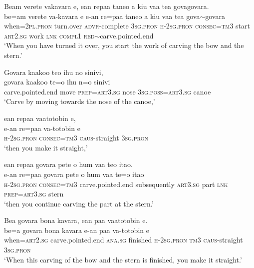 \ea\label{ex:text18-23}
Beam verete vakavara e, ean repaa taneo a kiu vaa tea govagovara.\\
\gll be=am	verete	va-kavara	e	e-an	re=paa	taneo	a	kiu	vaa	tea	gova{$\sim$}govara\\
     when=2\textsc{pl}.\textsc{pron}	turn.over	\textsc{advr}-complete	3\textsc{sg}.\textsc{pron}	\textsc{h}-2\textsc{sg}.\textsc{pron}	\textsc{consec}=\textsc{tm}3	start	\textsc{art}2.\textsc{sg}	work	\textsc{lnk}	\textsc{compl}1	\textsc{red}{$\sim$}carve.pointed.end\\
\glt `When you have turned it over, you start the work of carving the bow and the stern.'
\z

\ea\label{ex:text18-24}
Govara kaakoo teo ihu no sinivi,\\
\gll govara	kaakoo	te=o	ihu	n=o	sinivi\\
     carve.pointed.end	move	\textsc{prep}=\textsc{art}3.\textsc{sg}	nose	3\textsc{sg}.\textsc{poss}=\textsc{art}3.\textsc{sg}	canoe\\
\glt `Carve by moving towards the nose of the canoe,'
\z

\ea\label{ex:text18-25}
ean repaa vaatotobin e,\\
\gll e-an	re=paa	va-totobin	e\\
     \textsc{h}-2\textsc{sg}.\textsc{pron}	\textsc{consec}=\textsc{tm}3	\textsc{caus}-straight	3\textsc{sg}.\textsc{pron}\\
\glt `then you make it straight,'
\z

\newpage
\ea\label{ex:text18-26}
ean repaa govara pete o hum vaa teo itao.\\
\gll e-an	re=paa	govara	pete	o	hum	vaa	te=o	itao\\
     \textsc{h}-2\textsc{sg}.\textsc{pron}	\textsc{consec}=\textsc{tm}3	carve.pointed.end	subsequently	\textsc{art}3.\textsc{sg}	part	\textsc{lnk}	\textsc{prep}=\textsc{art}3.\textsc{sg}	stern\\
\glt `then you continue carving the part at the stern.'
\z

\ea\label{ex:text18-27}
Bea govara bona kavara, ean paa vaatotobin e.\\
\gll be=a	govara	bona	kavara	e-an	paa	va-totobin	e\\
     when=\textsc{art}2.\textsc{sg}	carve.pointed.end	\textsc{ana}.\textsc{sg}	finished	\textsc{h}-2\textsc{sg}.\textsc{pron}	\textsc{tm}3	\textsc{caus}-straight	3\textsc{sg}.\textsc{pron}\\
\glt `When this carving of the bow and the stern is finished, you make it straight.'
\z

